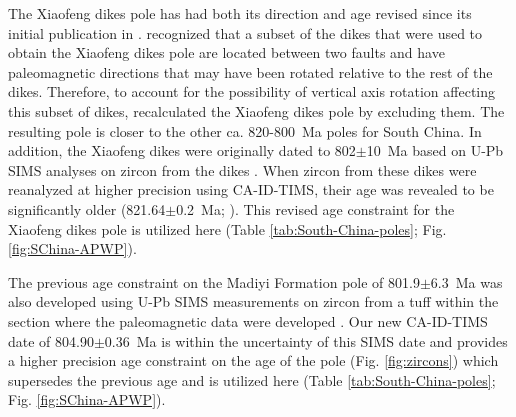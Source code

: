 The Xiaofeng dikes pole has had both its direction and age revised since its initial publication in \citet{Li2004a}. \citet{Jing2019a} recognized that a subset of the dikes that were used to obtain the Xiaofeng dikes pole are located between two faults and have paleomagnetic directions that may have been rotated relative to the rest of the dikes. Therefore, to account for the possibility of vertical axis rotation affecting this subset of dikes, \citet{Jing2019a} recalculated the Xiaofeng dikes pole by excluding them. The resulting pole is closer to the other ca. 820-800~Ma poles for South China. In addition, the Xiaofeng dikes were originally dated to 802$\pm$10~Ma based on U-Pb SIMS analyses on zircon from the dikes \citep{Li2004a}. When zircon from these dikes were reanalyzed at higher precision using CA-ID-TIMS, their age was revealed to be significantly older (821.64$\pm$0.2~Ma; \citealp{Wang2016b}). This revised age constraint for the Xiaofeng dikes pole is utilized here (Table \ref{tab:South-China-poles}; Fig. \ref{fig:SChina-APWP}).

The previous age constraint on the Madiyi Formation pole of 801.9$\pm$6.3~Ma was also developed using U-Pb SIMS measurements on zircon from a tuff within the section where the paleomagnetic data were developed \citep{Xian2020a}. Our new CA-ID-TIMS date of 804.90$\pm$0.36~Ma is within the uncertainty of this SIMS date and provides a higher precision age constraint on the age of the pole (Fig. \ref{fig:zircons}) which supersedes the previous age and is utilized here (Table \ref{tab:South-China-poles}; Fig. \ref{fig:SChina-APWP}).

